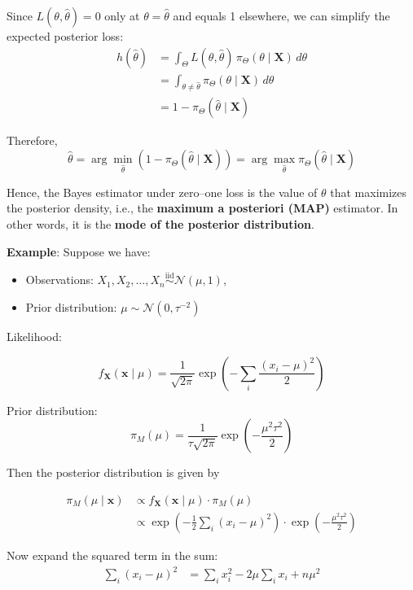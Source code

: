 \documentclass[twoside]{book}
\begin{document}
\begin{enumerate}
  Since \(L(\theta, \hat{\theta}) = 0\) only at \(\theta = \hat{\theta}\) and equals 1 elsewhere, we can simplify the expected posterior loss:
  \begin{align*}
  h(\hat{\theta}) &= \int_{\Theta} L(\theta,\hat{\theta})\,\pi_{\Theta}(\theta\mid \mathbf{X})\,d\theta \\
  &= \int_{\theta \neq \hat{\theta}} \pi_{\Theta}(\theta\mid \mathbf{X})\,d\theta\\ &
      = 1 - \pi_{\Theta}(\hat{\theta} \mid \mathbf{X})
  \end{align*}



  Therefore,
  \[
    \hat{\theta} = \arg\min_{\hat{\theta}} \left(1 - \pi_{\Theta}(\hat{\theta}\mid \mathbf{X})\right)
    = \arg\max_{\hat{\theta}} \pi_{\Theta}(\hat{\theta} \mid \mathbf{X})
  \]

  Hence, the Bayes estimator under zero–one loss is the value of \(\theta\) that maximizes the posterior density, i.e., the \textbf{maximum a posteriori (MAP)} estimator. In other words, it is the \textbf{mode of the posterior distribution}.

\end{enumerate}

\textbf{Example}: Suppose we have:
\begin{itemize}
  \item Observations: \( X_1, X_2, \dots, X_n \overset{\text{iid}}{\sim} \mathcal{N}(\mu, 1) \),
  \item Prior distribution: \( \mu \sim \mathcal{N}(0, \tau^{-2}) \)
\end{itemize}

Likelihood:

$$f_{\textbf{X}}(\textbf{x}\mid\mu) = \frac{1}{\sqrt{2\pi}}\exp \left(-\sum_i\frac{(x_i - \mu)^2}{2} \right) $$

Prior distribution:
$$\pi_M(\mu) = \frac{1}{\tau\sqrt{2\pi}}\exp \left(-\frac{\mu^2\tau^2}{2} \right)$$

Then the posterior distribution is given by

\begin{align*}
\pi_M(\mu \mid \textbf{x}) &\propto f_{\textbf{X}}(\textbf{x}\mid\mu) \cdot \pi_M(\mu) \\
&\propto \exp\left(-\frac{1}{2}\sum_i(x_i - \mu)^2 \right) \cdot \exp \left(-\frac{\mu^2\tau^2}{2} \right)
\end{align*}

Now expand the squared term in the sum:
\begin{align*}
\sum_i (x_i - \mu)^2 &= \sum_i x_i^2 - 2\mu \sum_i x_i + n\mu^2
\end{align*}
\end{document}
